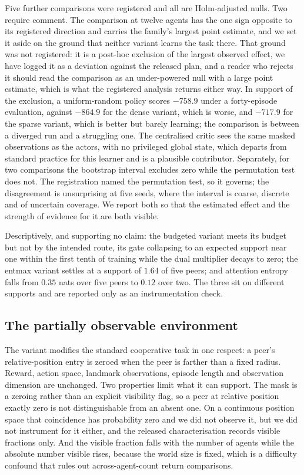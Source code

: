 Five further comparisons were registered and all are Holm-adjusted nulls. Two
require comment. The comparison at twelve agents has the one sign opposite to
its registered direction and carries the family's largest point estimate, and
we set it aside on the ground that neither variant learns the task there. That
ground was not registered: it is a post-hoc exclusion of the largest observed
effect, we have logged it as a deviation against the released plan, and a
reader who rejects it should read the comparison as an under-powered null with
a large point estimate, which is what the registered analysis returns either
way. In support of the exclusion, a uniform-random policy scores
$-758.9$ under a forty-episode evaluation,
against $-864.9$ for the dense variant, which is worse, and $-717.9$ for the
sparse variant, which is better but barely learning; the comparison is between a
diverged run and a struggling one. The centralised critic sees the same masked
observations as the actors, with no privileged global state, which departs from
standard practice for this learner and is a plausible contributor. Separately, for two comparisons the bootstrap
interval excludes zero while the permutation test does not. The registration
named the permutation test, so it governs; the disagreement is unsurprising at
five seeds, where the interval is coarse, discrete and of uncertain coverage. We
report both so that the estimated effect and the strength of evidence for it are
both visible.

Descriptively, and supporting no claim: the budgeted variant meets its budget
but not by the intended route, its gate collapsing to an expected support near
one within the first tenth of training while the dual multiplier decays to zero;
the entmax variant settles at a support of $1.64$ of five peers; and attention
entropy falls from $0.35$ nats over five peers to $0.12$ over two. The three sit
on different supports and are reported only as an instrumentation check.

\subsection{The partially observable environment}
\label{app:env}

The variant modifies the standard cooperative task in one respect: a peer's
relative-position entry is zeroed when the peer is farther than a fixed radius.
Reward, action space, landmark observations, episode length and observation
dimension are unchanged. Two properties limit what it can support. The mask is a
zeroing rather than an explicit visibility flag, so a peer at relative position
exactly zero is not distinguishable from an absent one. On a continuous position
space that coincidence has probability zero and we did not observe it, but we
did not instrument for it either, and the released characterisation records
visible fractions only. And the visible
fraction falls with the number of agents while the absolute number visible
rises, because the world size is fixed, which is a difficulty confound that
rules out across-agent-count return comparisons.


